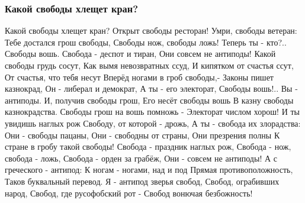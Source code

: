  
 
 

\subsubsection{Какой свободы хлещет кран?}

\obeycr
Какой свободы хлещет кран?
Открыт свободы ресторан!
Умри, свободы ветеран:
Тебе достался грош свободы,
Свободы нож, свободы ложь!
Теперь ты - кто?.. Свободы вошь.
Свобода - деспот и тиран,
Они совсем не антиподы!
Какой свободы грудь сосут,
Как вымя невозвратных ссуд,
И кипятком от счастья ссут,
От счастья, что тебя несут
Вперёд ногами в гроб свободы,-
Законы пишет казнокрад,
Он - либерал и демократ,
А ты - его электорат,
Свободы вошь!.. Вы - антиподы.
И, получив свободы грош,
Его несёт свободы вошь
В казну свободы казнокрадства.
Свободы грош на вошь помножь -
Электорат числом хорош!
И ты увидишь наглых рож
Свободу, от которой - дрожь,
А ты - свобода их злорадства:
Они - свободы пацаны,
Они - свободны от страны,
Они презрения полны
К стране в гробу такой свободы!
Свобода - праздник наглых рож,
Свобода - нож, свобода - ложь,
Свобода - орден за грабёж,
Они - совсем не антиподы!
А с греческого - антипод:
К ногам - ногами, над и под
Прямая противоположность,
Таков буквальный перевод.
Я - антипод зверья свобод,
Свобод, ограбивших народ,
Свобод, где русофобский рот -
Свобод вонючая безбожность!
\restorecr
